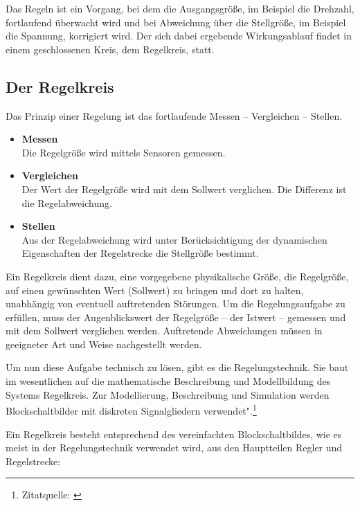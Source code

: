 Das Regeln ist ein Vorgang, bei dem die Ausgangsgröße, im Beispiel die Drehzahl, fortlaufend überwacht wird und bei Abweichung über die Stellgröße, im Beispiel die Spannung, korrigiert wird. Der sich dabei ergebende Wirkungsablauf findet in einem geschlossenen Kreis, dem Regelkreis, statt.
\vspace{5mm}

\subsection{Der Regelkreis}
Das Prinzip einer Regelung ist das fortlaufende Messen – Vergleichen – Stellen.
\\[5mm]

\begin{itemize}
	\item \textbf{Messen}
	\\[1mm] Die Regelgröße wird mittels Sensoren gemessen.
	\medskip
	\item \textbf{Vergleichen}
	\\[1mm] Der Wert der Regelgröße wird mit dem Sollwert verglichen. Die Differenz ist die Regelabweichung.
	\medskip
	\item \textbf{Stellen}
	\\[1mm] Aus der Regelabweichung wird unter Berücksichtigung der dynamischen Eigenschaften der Regelstrecke die Stellgröße bestimmt.
\end{itemize}
\vspace{3mm}

Ein Regelkreis dient dazu, eine vorgegebene physikalische Größe, die Regelgröße, auf einen gewünschten Wert (Sollwert) zu bringen und dort zu halten, unabhängig von eventuell auftretenden Störungen. Um die Regelungsaufgabe zu erfüllen, muss der Augenblickswert der Regelgröße – der Istwert – gemessen und mit dem Sollwert verglichen werden. Auftretende Abweichungen müssen in geeigneter Art und Weise nachgestellt werden.

Um nun diese Aufgabe technisch zu lösen, gibt es die Regelungstechnik. Sie baut im wesentlichen auf die mathematische Beschreibung und Modellbildung des Systems Regelkreis. Zur Modellierung, Beschreibung und Simulation werden Blockschaltbilder mit diskreten Signalgliedern verwendet".\footnote{Zitatquelle: \cite{Regelungstechnik}}
	
\newpage

Ein Regelkreis besteht entsprechend des vereinfachten Blockschaltbildes, wie es meist in der Regelungstechnik verwendet wird, aus den Hauptteilen Regler und Regelstrecke:
\\[5mm]

